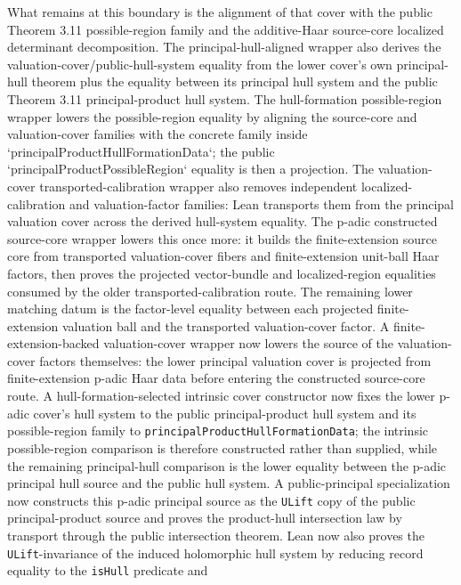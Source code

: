 \begin{proposition}
  What remains at this boundary is the alignment of that cover with the public
  Theorem 3.11 possible-region family and the additive-Haar source-core
  localized determinant decomposition.  The principal-hull-aligned wrapper
  also derives the valuation-cover/public-hull-system equality from the lower
  cover's own principal-hull theorem plus the equality between its principal
  hull system and the public Theorem 3.11 principal-product hull system.  The
  hull-formation possible-region wrapper lowers the possible-region equality
  by aligning the source-core and valuation-cover families with the concrete
  family inside `principalProductHullFormationData`; the public
  `principalProductPossibleRegion` equality is then a projection.  The
  valuation-cover transported-calibration wrapper also removes independent
  localized-calibration and valuation-factor families: Lean transports them
  from the principal valuation cover across the derived hull-system equality.
  The p-adic constructed source-core wrapper lowers this once more: it builds
  the finite-extension source core from transported valuation-cover fibers and
  finite-extension unit-ball Haar factors, then proves the projected
  vector-bundle and localized-region equalities consumed by the older
  transported-calibration route.  The remaining lower matching datum is the
  factor-level equality between each projected finite-extension valuation ball
  and the transported valuation-cover factor.  A finite-extension-backed
  valuation-cover wrapper now lowers the source of the valuation-cover factors
  themselves: the lower principal valuation cover is projected from
  finite-extension p-adic Haar data before entering the constructed source-core
  route.  A hull-formation-selected intrinsic cover constructor now fixes the
  lower p-adic cover's hull system to the public principal-product hull system
  and its possible-region family to
  \texttt{principalProductHullFormationData}; the intrinsic possible-region
  comparison is therefore constructed rather than supplied, while the remaining
  principal-hull comparison is the lower equality between the p-adic principal
  hull source and the public hull system.  A public-principal specialization
  now constructs this p-adic principal source as the \texttt{ULift} copy of the
  public principal-product source and proves the product-hull intersection law
  by transport through the public intersection theorem.  Lean now also proves
  the \texttt{ULift}-invariance of the induced holomorphic hull system by
  reducing record equality to the \texttt{isHull} predicate and

\end{proposition}
